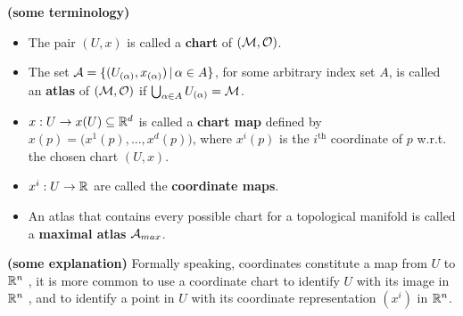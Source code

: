 \documentclass[12pt]{article} %
\newcommand{\bfs}[1]{\textbf{({#1}) }}
\begin{document}
    \vspace{-3cm}
\bter\bfs{some terminology}
    \begin{itemize}
        \item The pair $(U,x)$ is called a \textbf{chart} of $(\mathcal{M},\mathcal{O})$. 
        \item The set $\mathcal{A} = \{(U_{(\alpha)},x_{(\alpha)}) \, | \, \alpha\in A\}$, for some arbitrary index set $A$, is called an \textbf{atlas} of $(\mathcal{M},\mathcal{O})$ if $\bigcup_{\alpha\in A} U_{(\alpha)} = \mathcal{M}$.
        \item $x:U\to x(U)\subseteq\mathbb{R}^d$ is called a \textbf{chart map} defined by $x(p) = \big(x^1(p),...,x^d(p)\big)$, where $x^i(p)$ is the $i^{\text{th}}$ coordinate of $p$ w.r.t. the chosen chart $(U,x)$.
        \item $x^i:U \to \mathbb{R}$ are called the \textbf{coordinate maps}.
        \item
    An atlas that contains every possible chart for a topological manifold is called a \textbf{maximal atlas} $\mathcal{A}_{max}$.
    \end{itemize}
\eter 
\begin{rema}\bfs{some explanation}\label{re:dinfada}
Formally speaking, coordinates constitute a map from $U$ to $\mathbb{R}^n$ , it is more common to use a coordinate chart to identify $U$ with its image in $\mathbb{R}^n$ , and to identify a point in $U$ with its coordinate representation $(x^i)$ in $\mathbb{R}^n$.
\end{rema}
\end{document}
